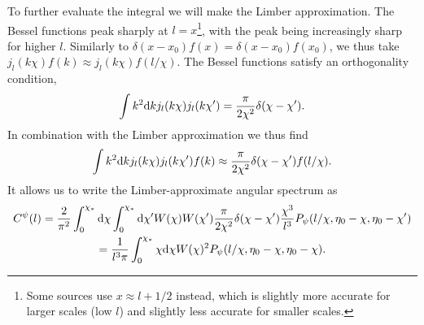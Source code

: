 \documentclass[11pt]{article} %
\DeclareRobustCommand{\d}{\ifmmode\text{d}\else d\fi}
\begin{document}
To further evaluate the integral we will make the Limber approximation. The Bessel functions peak sharply at $l=x$\footnote{Some sources use $x\approx l+1/2$ instead, which is slightly more accurate for larger scales (low $l$) and slightly less accurate for smaller scales.}, with the peak being increasingly sharp for higher $l$. Similarly to $\delta(x-x_0)f(x)=\delta(x-x_0)f(x_0)$, we thus take $j_l(k\chi)f(k)\approx j_l(k\chi)f(l/\chi)$. The Bessel functions satisfy an orthogonality condition,
\begin{equation}
    \int k^2\d k j_l(k\chi)j_l(k\chi') = \frac{\pi}{2\chi^2}\delta(\chi-\chi').
\end{equation}
In combination with the Limber approximation we thus find
\begin{equation}
    \int k^2\d k j_l(k\chi)j_l(k\chi')f(k) \approx \frac{\pi}{2\chi^2}\delta(\chi-\chi')f(l/\chi).
\end{equation}
It allows us to write the Limber-approximate angular spectrum as
\begin{gather}
    C^\psi(l) = \frac{2}{\pi^2}\int_0^{\chi_*}\d \chi\int_0^{\chi_*}\d \chi' W(\chi)W(\chi') \frac{\pi}{2\chi^2}\delta(\chi-\chi')\frac{\chi^3}{l^3}P_\psi(l/\chi,\eta_0 - \chi, \eta_0-\chi')\\
    = \frac{1}{l^3\pi}\int_0^{\chi_*}\chi\d \chi W(\chi)^2 P_\psi(l/\chi,\eta_0 - \chi, \eta_0-\chi). \label{eq:lpsintermsofpsi}
\end{gather}
\end{document}
